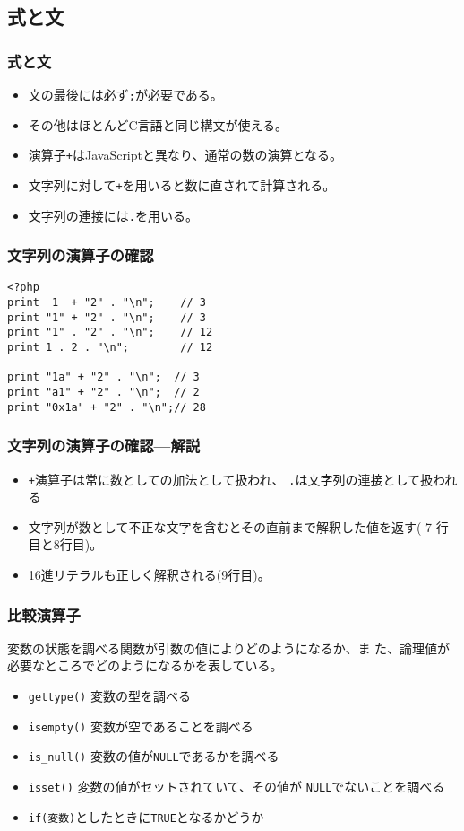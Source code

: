 \subsection{式と文}
\begin{frame}[containsverbatim]
\frametitle{式と文}
\begin{itemize}
 \item 文の最後には必ず\texttt{;}が必要である。
 \item その他はほとんどC言語と同じ構文が使える。
 \item 演算子\texttt{+}はJavaScriptと異なり、通常の数の演算となる。
 \item 文字列に対して\texttt{+}を用いると数に直されて計算される。
 \item 文字列の連接には\texttt{.}を用いる。
\end{itemize}
\end{frame}
\begin{frame}[containsverbatim]
\frametitle{文字列の演算子の確認}
\begin{verbatim}
<?php
print  1  + "2" . "\n";    // 3
print "1" + "2" . "\n";    // 3
print "1" . "2" . "\n";    // 12
print 1 . 2 . "\n";        // 12

print "1a" + "2" . "\n";  // 3
print "a1" + "2" . "\n";  // 2
print "0x1a" + "2" . "\n";// 28
\end{verbatim}
\end{frame}
\begin{frame}[containsverbatim]
\frametitle{文字列の演算子の確認---解説}
\begin{itemize}
 \item \texttt{+}演算子は常に数としての加法として扱われ、
 \texttt{.}は文字列の連接として扱われる
 \item 文字列が数として不正な文字を含むとその直前まで解釈した値を返す(
       7 行目と8行目)。
 \item 16進リテラルも正しく解釈される(9行目)。
\end{itemize}
\end{frame}
\begin{frame}[containsverbatim]
\frametitle{比較演算子}
変数の状態を調べる関数が引数の値によりどのようになるか、ま
た、論理値が必要なところでどのようになるかを表している。
\begin{itemize}
 \item \texttt{gettype()} 変数の型を調べる
 \item \texttt{isempty()} 変数が空であることを調べる
 \item \texttt{is\_null()} 変数の値が\texttt{NULL}であるかを調べる
 \item \texttt{isset()} 変数の値がセットされていて、その値が
       \texttt{NULL}でないことを調べる
 \item \texttt{if(変数)}としたときに\texttt{TRUE}となるかどうか
\end{itemize}
\end{frame}
